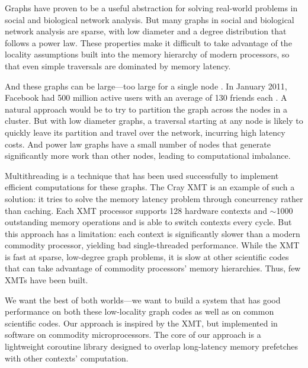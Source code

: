 \documentclass{acm_proc_article-sp}
\begin{document}
Graphs have proven to be a useful abstraction for solving real-world
problems in social and biological network analysis. But many graphs in
social and biological network analysis are sparse, with low diameter
and a degree distribution that follows a power law. These properties
make it difficult to take advantage of the locality assumptions built
into the memory hierarchy of modern processors, so that even simple
traversals are dominated by memory latency.

And these graphs can be large---too large for a single node . In January 2011, Facebook had 500 million active users with an average of
130 friends each \cite{Facebook:2011p91}. A natural approach would be
to try to partition the graph across the nodes in a cluster. But with
low diameter graphs, a traversal starting at any node is likely to
quickly leave its partition and travel over the network, incurring
high latency costs. And power law graphs have a small number of nodes
that generate significantly more work than other nodes, leading to
computational imbalance.



Multithreading is a technique that has been used successfully to
implement efficient computations for these graphs. The Cray XMT is an
example of such a solution: it tries to solve the memory latency
problem through concurrency rather than caching. Each XMT processor
supports 128 hardware contexts and $\sim$1000 outstanding memory
operations and is able to switch contexts every cycle. But this
approach has a limitation: each context is significantly slower than a
modern commodity processor, yielding bad single-threaded
performance. While the XMT is fast at sparse, low-degree graph
problems, it is slow at other scientific codes that can take advantage
of commodity processors' memory hierarchies. Thus, few XMTs have been
built.

We want the best of both worlds---we want to build a system that has
good performance on both these low-locality graph codes as well as on
common scientific codes. Our approach is inspired by the XMT, but
implemented in software on commodity microprocessors. The core of our
approach is a lightweight coroutine library designed to overlap
long-latency memory prefetches with other contexts' computation. 
\end{document}
